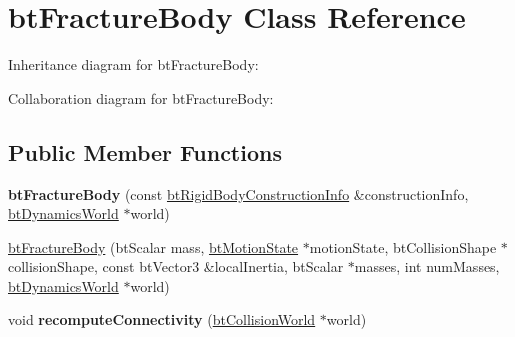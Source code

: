 \hypertarget{classbt_fracture_body}{\section{bt\+Fracture\+Body Class Reference}
\label{classbt_fracture_body}
}


Inheritance diagram for bt\+Fracture\+Body\+:


Collaboration diagram for bt\+Fracture\+Body\+:
\subsection*{Public Member Functions}
\begin{DoxyCompactItemize}
\item 
\hypertarget{classbt_fracture_body_a84a5f54fe4c165da0204fedc87be824e}{{\bfseries bt\+Fracture\+Body} (const \hyperlink{structbt_rigid_body_1_1bt_rigid_body_construction_info}{bt\+Rigid\+Body\+Construction\+Info} \&construction\+Info, \hyperlink{classbt_dynamics_world}{bt\+Dynamics\+World} $\ast$world)}\label{classbt_fracture_body_a84a5f54fe4c165da0204fedc87be824e}

\item 
\hyperlink{classbt_fracture_body_af1602de70861d95f4918edf7f77647b2}{bt\+Fracture\+Body} (bt\+Scalar mass, \hyperlink{classbt_motion_state}{bt\+Motion\+State} $\ast$motion\+State, bt\+Collision\+Shape $\ast$collision\+Shape, const bt\+Vector3 \&local\+Inertia, bt\+Scalar $\ast$masses, int num\+Masses, \hyperlink{classbt_dynamics_world}{bt\+Dynamics\+World} $\ast$world)
\item 
\hypertarget{classbt_fracture_body_a1fab6c0465b284fefffb7e80153b6671}{void {\bfseries recompute\+Connectivity} (\hyperlink{classbt_collision_world}{bt\+Collision\+World} $\ast$world)}\label{classbt_fracture_body_a1fab6c0465b284fefffb7e80153b6671}

\end{DoxyCompactItemize}
